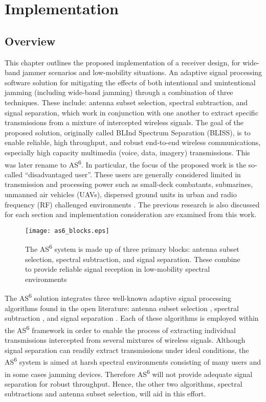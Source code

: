\chapter{Implementation}
\label{ch:implementation}

\section{Overview}

This chapter outlines the proposed implementation of a receiver design, for wide-band jammer scenarios and low-mobility situations.  An adaptive signal processing software solution for mitigating the effects of both intentional and unintentional jamming (including wide-band jamming) through a combination of three techniques.  These include: antenna subset selection, spectral subtraction, and signal separation, which work in conjunction with one another to extract specific transmissions from a mixture of intercepted wireless signals. The goal of the proposed solution, originally called BLInd Spectrum Separation (BLISS), is to enable reliable, high throughput, and robust end-to-end wireless communications, especially high capacity multimedia (voice, data, imagery) transmissions. This was later rename to AS\textsuperscript{6}.  In particular, the focus of the proposed work is the so-called ``disadvantaged user''.  These users are generally considered limited in transmission and processing power such as small-deck combatants, submarines, unmanned air vehicles (UAVs), dispersed ground units in urban and radio frequency (RF) challenged environments \cite{midterm_report}.  The previous research is also discussed for each section and implementation consideration are examined from this work.\\

\begin{figure}
\texttt{[image: as6\_blocks.eps]}
\caption{The AS\textsuperscript{6} system is made up of three primary blocks: antenna subset selection, spectral subtraction, and signal separation.  These combine to provide reliable signal reception in low-mobility spectral environments}
\end{figure}

The AS\textsuperscript{6} solution integrates three well-known adaptive signal processing algorithms found in the open literature: antenna subset selection \cite{antss}, spectral subtraction \cite{boll}, and signal separation \cite{AMUSE}. Each of these algorithms is employed within the AS\textsuperscript{6} framework in order to enable the process of extracting individual transmissions intercepted from several mixtures of wireless signals. Although signal separation can readily extract transmissions under ideal conditions, the AS\textsuperscript{6} system is aimed at harsh spectral environments consisting of many users and in some cases jamming devices. Therefore AS\textsuperscript{6} will not provide adequate signal separation for robust throughput.  Hence, the other two algorithms, spectral subtractions and antenna subset selection, will aid in this effort.\\

